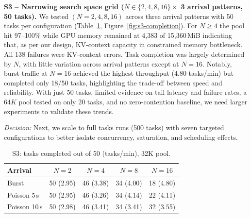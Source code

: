 \documentclass[10pt,twocolumn,letterpaper]{article}
\newcommand{\dec}[1]{\par\noindent\textit{Decision:} #1\par}
\begin{document}
\textbf{S3 -- Narrowing search space grid ($N\in\{2,4,8,16\}\times$ 3 arrival patterns, 50 tasks).} We tested $(N=2,4,8,16)$ across three arrival patterns with 50 tasks per configuration (Table~\ref{tab:s3}, Figure~\ref{fig:s3-completion}). For $N\ge4$ the pool hit 97--100\% while GPU memory remained at 4{,}383 of 15{,}360\,MiB indicating that, as per our design, KV-context capacity in constrained memory bottleneck.  All 138 failures were KV-context errors. Task completion was largely determined by $N$, with little variation across arrival patterns except at $N=16$. Notably, burst traffic at $N=16$ achieved the highest throughput (4.80 tasks/min) but completed only 18/50 tasks, highlighting the trade-off between speed and reliability. With just 50 tasks, limited evidence on tail latency and failure rates, a $64K$ pool tested on only 20 tasks, and no zero-contention baseline, we need larger experiments to validate these trends.
\dec{Next, we scale to full tasks runs (500 tasks) with seven targeted configurations to better isolate concurrency, saturation, and scheduling effects.}

\begin{table}[h]
\centering\small
\caption{S3: tasks completed out of 50 (tasks/min), 32K pool.}
\label{tab:s3}
\setlength{\tabcolsep}{4pt}
\begin{tabular}{@{}lcccc@{}}
\toprule
Arrival & $N{=}2$ & $N{=}4$ & $N{=}8$ & $N{=}16$\\
\midrule
Burst & 50 (2.95) & 46 (3.38) & 34 (4.00) & 18 (4.80)\\
Poisson 5\,s & 50 (2.95) & 46 (3.26) & 34 (4.14) & 22 (4.11)\\
Poisson 10\,s & 50 (2.98) & 46 (3.41) & 34 (3.41) & 32 (3.55)\\
\bottomrule
\end{tabular}
\end{table}
\end{document}
